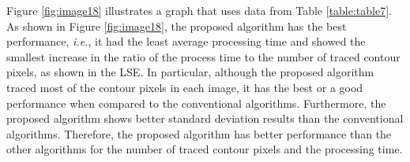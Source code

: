\documentclass[sensors,article,accept,moreauthors,pdftex,10pt,a4paper]{mdpi}
\newcommand{\JHMEMO}[1]{\textcolor{red}{#1}}
\begin{document}

Figure \ref{fig:image18} illustrates a graph that uses data from Table \ref{table:table7}. As shown in Figure \ref{fig:image18}, the proposed algorithm has the best performance, \emph{i.e.}, it had the least average processing time and showed the smallest increase in the ratio of the process time to the number of traced contour pixels, as shown in the LSE. In particular, although the proposed algorithm traced most of the contour pixels in each image, it has the best or a good performance when compared to the conventional algorithms. Furthermore, the proposed algorithm shows better standard deviation results than the conventional algorithms. Therefore, the proposed algorithm has better performance than the other algorithms for the number of traced contour pixels and the processing time.





\end{document}

